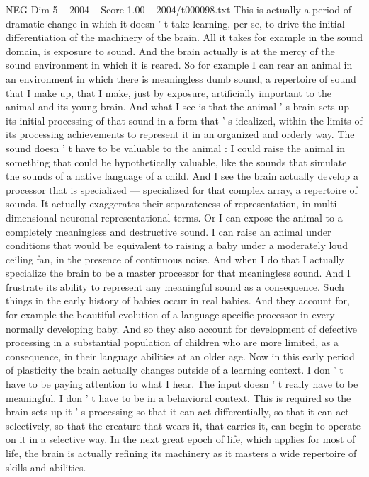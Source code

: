 \begin{textsample}{NEG Dim 5 – 2004 – Score 1.00 – 2004/t000098.txt}
This is actually a period of dramatic change in which it doesn ' t take learning, per se, to drive the initial differentiation of the machinery of the brain.
All it takes for example in the sound domain, is exposure to sound.
And the brain actually is at the mercy of the sound environment in which it is reared.
So for example I can rear an animal in an environment in which there is meaningless dumb sound, a repertoire of sound that I make up, that I make, just by exposure, artificially important to the animal and its young brain.
And what I see is that the animal ' s brain sets up its initial processing of that sound in a form that ' s idealized, within the limits of its processing achievements to represent it in an organized and orderly way.
The sound doesn ' t have to be valuable to the animal : I could raise the animal in something that could be hypothetically valuable, like the sounds that simulate the sounds of a native language of a child.
And I see the brain actually develop a processor that is specialized — specialized for that complex array, a repertoire of sounds.
It actually exaggerates their separateness of representation, in multi-dimensional neuronal representational terms.
Or I can expose the animal to a completely meaningless and destructive sound.
I can raise an animal under conditions that would be equivalent to raising a baby under a moderately loud ceiling fan, in the presence of continuous noise.
And when I do that I actually specialize the brain to be a master processor for that meaningless sound.
And I frustrate its ability to represent any meaningful sound as a consequence.
Such things in the early history of babies occur in real babies.
And they account for, for example the beautiful evolution of a language-specific processor in every normally developing baby.
And so they also account for development of defective processing in a substantial population of children who are more limited, as a consequence, in their language abilities at an older age.
Now in this early period of plasticity the brain actually changes outside of a learning context.
I don ' t have to be paying attention to what I hear.
The input doesn ' t really have to be meaningful.
I don ' t have to be in a behavioral context.
This is required so the brain sets up it ' s processing so that it can act differentially, so that it can act selectively, so that the creature that wears it, that carries it, can begin to operate on it in a selective way.
In the next great epoch of life, which applies for most of life, the brain is actually refining its machinery as it masters a wide repertoire of skills and abilities.

\end{textsample}
